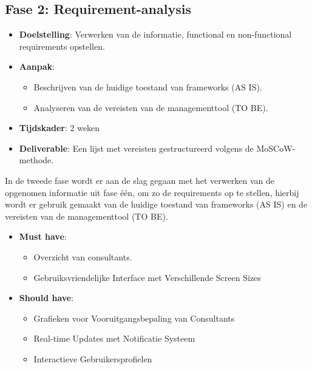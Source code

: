 \documentclass{hogent-article}
\begin{document}
\subsection*{Fase 2: Requirement-analysis}
\begin{itemize}
\item \textbf{Doelstelling}: Verwerken van de informatie, functional en non-functional requirements opstellen.
\item \textbf{Aanpak}:
\begin{itemize}
\item Beschrijven van de huidige toestand van frameworks (AS IS).
\item Analyseren van de vereisten van de managementtool (TO BE).
\end{itemize}
\item \textbf{Tijdskader}: 2 weken
\item \textbf{Deliverable}: Een lijst met vereisten gestructureerd volgens de MoSCoW-methode.
\end{itemize}
\bigbreak
In de tweede fase wordt er aan de slag gegaan met het verwerken van de opgenomen informatie uit fase \'{e}\'{e}n, om zo de requirements op te stellen, hierbij wordt er gebruik gemaakt van de huidige toestand van frameworks (AS IS) en de vereisten van de managementtool (TO BE).
\begin{itemize}
\item \textbf{Must have}:
\begin{itemize}
\item Overzicht van consultants.
\item Gebruiksvriendelijke Interface met Verschillende Screen Sizes
\end{itemize}

\item \textbf{Should have}:
\begin{itemize}
  \item Grafieken voor Vooruitgangsbepaling van Consultants
  \item Real-time Updates met Notificatie Systeem
  \item Interactieve Gebruikersprofielen


\end{itemize}
\end{itemize} 
\bigskip
\end{document}
